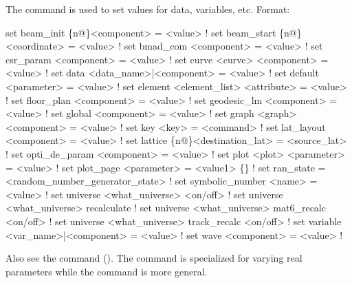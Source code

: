 {{The  command is used to set values for data,
variables, etc. Format:
\begin{example}
  set beam_init \{n@\}<component> = <value>                   ! 
  set beam_start \{n@\}<coordinate> = <value>                 ! 
  set bmad_com <component> = <value>                        ! 
  set csr_param <component> = <value>                       ! 
  set curve <curve> <component> = <value>                   ! 
  set data <data_name>|<component> = <value>                ! 
  set default <parameter> = <value>                         ! 
  set element <element_list> <attribute> = <value>          ! 
  set floor_plan <component> = <value>                      ! 
  set geodesic_lm <component> = <value>                     ! 
  set global <component> = <value>                          ! 
  set graph <graph> <component> = <value>                   ! 
  set key <key> = <command>                                 ! 
  set lat_layout <component> = <value>                      ! 
  set lattice \{n@\}<destination\_lat> = <source\_lat>          ! 
  set opti_de_param <component> = <value>                   ! 
  set plot <plot> <parameter> = <value>                     ! 
  set plot_page <parameter> = <value1> \{<value2>\}           ! 
  set ran_state = <random_number_generator_state>           ! 
  set symbolic_number <name> = <value>                      ! 
  set universe <what_universe> <on/off>                     ! 
  set universe <what_universe> recalculate                  ! 
  set universe <what_universe> mat6_recalc <on/off>         ! 
  set universe <what_universe> track_recalc <on/off>        ! 
  set variable <var_name>|<component> = <value>             ! 
  set wave <component> = <value>                            ! 
\end{example}

\vskip 10pt 

Also see the  command (). The  command is specialized
for varying real parameters while the  command is more general.

}}
